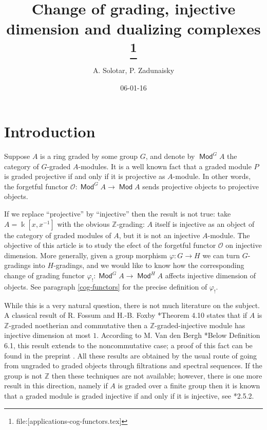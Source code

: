 \documentclass[11pt,fleqn]{article}
\title{
Change of grading, injective dimension and dualizing complexes
\footnote{file:[applications-cog-functors.tex]}
}
\date{06-01-16}
\author{A. Solotar, P. Zadunaisky}
\newcommand\ZZ{\mathbb Z}
\renewcommand\to{\longrightarrow}
\renewcommand\phi{\varphi}
\renewcommand\k{\Bbbk}
\renewcommand\O{\mathcal O}
\DeclareMathOperator\Mod{\mathsf{Mod}}
\begin{document}
\maketitle

\section{Introduction}

Suppose $A$ is a ring graded by some group $G$, and denote by $\Mod^G A$ the 
category of $G$-graded $A$-modules. It is a well known fact that a graded 
module $P$ is graded projective if and only if it is projective as $A$-module. 
In other words, the forgetful functor $\O: \Mod^G A \to \Mod A$ sends 
projective objects to projective objects.

If we replace ``projective'' by ``injective'' then the result is not true: 
take $A = \k[x,x^{-1}]$ with the obvious $\ZZ$-grading: $A$ itself is 
injective as an object of the category of graded modules of $A$, but it is not 
an injective $A$-module. The objective of this article is to study the efect 
of the forgetful functor $\O$ on injective dimension. More generally, given a 
group morphism $\phi: G \to H$ we can turn $G$-gradings into $H$-gradings, and
we would like to know how the corresponding change of grading functor 
$\phi_!: \Mod^G A \to \Mod^H A$ affects injective dimension of objects. See
paragraph \ref{cog-functors} for the precise definition of $\phi_!$.

While this is a very natural question, there is not much literature on the
subject. A classical result of R. Fossum and H.-B. Foxby 
\cite{FF-graded}*{Theorem 4.10} states that if $A$ is $\ZZ$-graded noetherian 
and commutative then a $\ZZ$-graded-injective module has injective dimension 
at most $1$. According to M. Van den Bergh \cite{VdB-existence-dc}*{Below 
Definition 6.1}, this result extends to the noncommutative case; a proof
of this fact can be found in the preprint \cite{Yek-note}. All these results 
are obtained by the usual route of going from ungraded to graded objects 
through filtrations and spectral sequences. If the group is not $\ZZ$ then 
these techniques are not available; however, there is one more result in this 
direction, namely if $A$ is graded over a finite group then it is known that a 
graded module is graded injective if and only if it is injective, see 
\cite{NV-graded-book3}*{2.5.2}.
\end{document}
